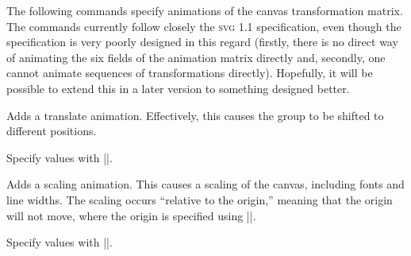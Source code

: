 The following commands specify animations of the canvas transformation
matrix. The commands currently follow closely the \textsc{svg 1.1}
specification, even though the specification is very poorly designed
in this regard (firstly, there is no direct way of animating the six
fields of the animation matrix directly and, secondly, one cannot
animate sequences of transformations directly). Hopefully, it will be
possible to extend this in a later version to something designed better.

\begin{command}{\pgfsys@animatetranslate}
  Adds a translate animation. Effectively, this causes the group to be
  shifted to different positions.
  
  Specify values with |\pgfsys@animation@translate|.
\begin{codeexample}[width=2cm]
\end{codeexample}
\end{command}

\begin{command}{\pgfsys@animatescale}
  Adds a scaling animation. This causes a scaling of the canvas,
  including fonts and line widths. The scaling occurs ``relative to the
  origin,'' meaning that the origin will not move, where the origin is
  specified using |\pgfsys@animation@origin|.
  
  Specify values with |\pgfsys@animation@scale|.
\begin{codeexample}[width=2cm]
\end{codeexample}
\begin{codeexample}[width=2cm]
\end{codeexample}
\end{command}

